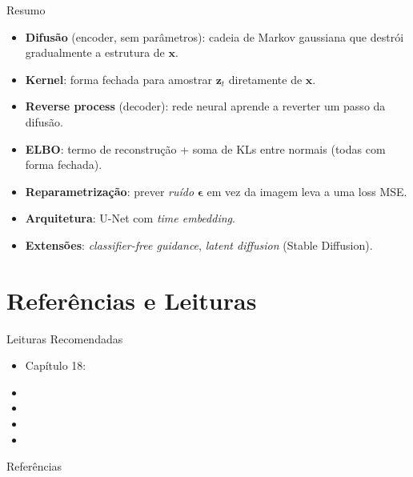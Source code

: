 \documentclass[aspectratio=169,xcolor=dvipsnames]{beamer}
\begin{document}
  \begin{frame}{Resumo}
    \begin{itemize}
      \item \textbf{Difusão} (encoder, sem parâmetros): cadeia de
      Markov gaussiana que destrói gradualmente a estrutura de $\mathbf{x}$.
      \item \textbf{Kernel}: forma fechada para amostrar $\mathbf{z}_t$
      diretamente de $\mathbf{x}$.
      \item \textbf{Reverse process} (decoder): rede neural aprende a
      reverter um passo da difusão.
      \item \textbf{ELBO}: termo de reconstrução + soma de KLs entre
      normais (todas com forma fechada).
      \item \textbf{Reparametrização}: prever \emph{ruído} $\boldsymbol{\epsilon}$
      em vez da imagem leva a uma loss MSE.
      \item \textbf{Arquitetura}: U-Net com \textit{time embedding}.
      \item \textbf{Extensões}: \textit{classifier-free guidance},
      \textit{latent diffusion} (Stable Diffusion).
    \end{itemize}
  \end{frame}

  \section*{Referências e Leituras}

  \begin{frame}{Leituras Recomendadas}
    \leiturasize
    \begin{itemize}
      \item Capítulo 18: 
      \item {}
      \item {}
      \item {}
      \item {}
    \end{itemize}
  \end{frame}

  \begin{frame}[allowframebreaks]{Referências}
    \sloppy
    \printbibliography[heading=none]
  \end{frame}
\end{document}
